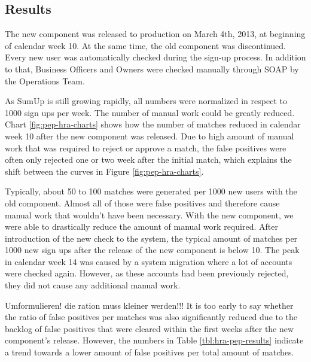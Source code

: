 \documentclass[a4paper, oneside]{csthesis}
\begin{document}
\subsection{Results}

The new component was released to production on March 4th, 2013, at beginning of calendar week 10. At the same time, the old component was discontinued. Every new user was automatically checked during the sign-up process. In addition to that, Business Officers and Owners were checked manually through SOAP by the Operations Team.

As SumUp is still growing rapidly, all numbers were normalized in respect to 1000 sign ups per week. The number of manual work could be greatly reduced. Chart \ref{fig:pep-hra-charts} shows how the number of matches reduced in calendar week 10 after the new component was released.
Due to high amount of manual work that was required to reject or approve a match, the false positives were often only rejected one or two week after the initial match, which explains the shift between the curves in Figure \ref{fig:pep-hra-charts}.

Typically, about 50 to 100 matches were generated per 1000 new users with the old component. Almost all of those were false positives and therefore cause manual work that wouldn't have been necessary. With the new component, we were able to drastically reduce the amount of manual work required. After introduction of the new check to the system, the typical amount of matches per 1000 new sign ups after the release of the new component is below 10. The peak in calendar week 14 was caused by a system migration where a lot of accounts were checked again. However, as these accounts had been previously rejected, they did not cause any additional manual work.

Umformulieren! die ration muss kleiner werden!!!
It is too early to say whether the ratio of false positives per matches was also significantly reduced due to the backlog of false positives that were cleared within the first weeks after the new component's release. However, the numbers in Table \ref{tbl:hra-pep-results} indicate a trend towards a lower amount of false positives per total amount of matches.
\end{document}
